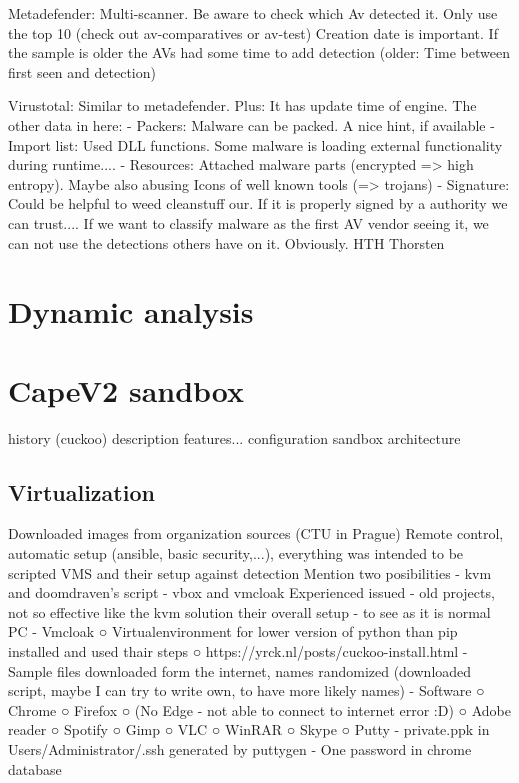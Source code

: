 Metadefender:
Multi-scanner. Be aware to check which Av detected it. Only use the top 10 (check out av-comparatives or av-test)
Creation date is important. If the sample is older the AVs had some time to add detection (older: Time between first seen and detection)


Virustotal:
Similar to metadefender. Plus: It has update time of engine.
The other data in here:
- Packers: Malware can be packed. A nice hint, if available
- Import list: Used DLL functions. Some malware is loading external functionality during runtime....
- Resources: Attached malware parts (encrypted => high entropy). Maybe also abusing Icons of well known tools (=> trojans)
- Signature: Could be helpful to weed cleanstuff our. If it is properly signed by a authority we can trust....
If we want to classify malware as the first AV vendor seeing it, we can not use the detections others have on it. Obviously.
HTH
Thorsten

\section{Dynamic analysis}
\section{CapeV2 sandbox}
history (cuckoo)
description
    features...
configuration
sandbox architecture

\subsection{Virtualization}
Downloaded images from organization sources (CTU in Prague)
Remote control, automatic setup (ansible, basic security,...), everything was intended to be scripted
VMS and their setup against detection
Mention two posibilities
    - kvm and doomdraven's script
    - vbox and vmcloak
        Experienced issued - old projects, not so effective like the kvm solution
their overall setup - to see as it is normal PC
    - Vmcloak
    ○ Virtualenvironment for lower version of python than pip installed and used thair steps
    ○ https://yrck.nl/posts/cuckoo-install.html
    - Sample files downloaded form the internet, names randomized (downloaded script, maybe I can try to write own, to have more likely names)
    - Software
    ○ Chrome
    ○ Firefox
    ○ (No Edge - not able to connect to internet error :D)
    ○ Adobe reader
    ○ Spotify
    ○ Gimp
    ○ VLC
    ○ WinRAR
    ○ Skype
    ○ Putty
    - private.ppk in Users/Administrator/.ssh generated by puttygen
    - One password in chrome database

